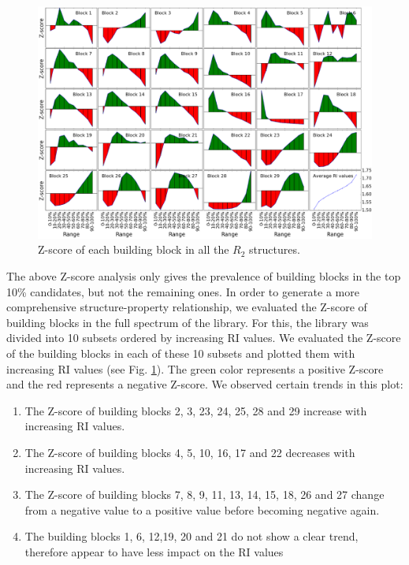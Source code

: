 \begin{figure}[htbp] 
	\centering
	\includegraphics[width=1.00\textwidth]{Chapter-5/Figures/All_BB_Z.eps}
	\caption{Z-score of each building block in all the $R_2$ structures. } 
	\label{fig:All_BB_Z} 
\end{figure}  

The above Z-score analysis only gives the prevalence of building blocks in the top 10\% candidates, but not the remaining ones. In order to generate a more comprehensive structure-property relationship, we evaluated the Z-score of building blocks in the full spectrum of the library. For this, the library was divided into 10 subsets ordered by increasing RI values. We evaluated the Z-score of the building blocks in each of these 10 subsets and plotted them with increasing RI values (see Fig. \ref{fig:All_BB_Z}). The green color represents a positive Z-score and the red represents a negative Z-score. We observed certain trends in this plot:
\begin{enumerate}
	\item The Z-score of building blocks 2, 3, 23, 24, 25, 28 and 29 increase with increasing RI values.
	\item The Z-score of building blocks 4, 5, 10, 16, 17 and 22 decreases with increasing RI values.
	\item The Z-score of building blocks 7, 8, 9, 11, 13, 14, 15, 18, 26 and 27 change from a negative value to a positive value before becoming negative again.
	\item The building blocks 1, 6, 12,19, 20 and 21 do not show a clear trend, therefore appear to have less impact on the RI values 
\end{enumerate}

